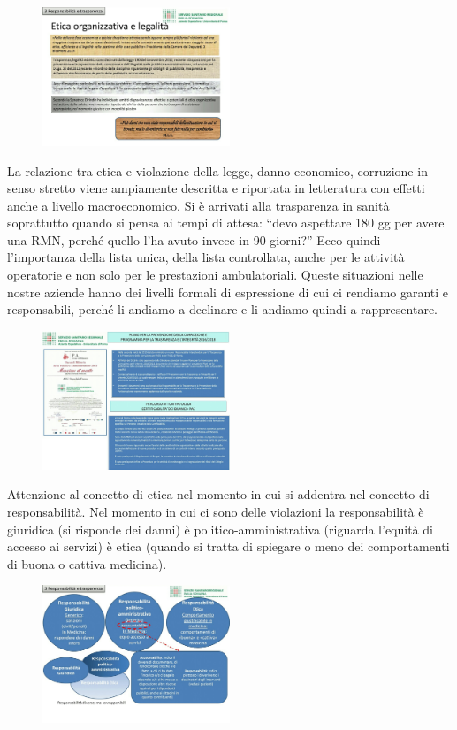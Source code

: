  \begin{figure}[!ht]
\centering
	\includegraphics[width=0.5\textwidth]{32/image14.jpeg}
	\end{figure}

La relazione tra etica e violazione della legge, danno economico,
corruzione in senso stretto viene ampiamente descritta e riportata in
letteratura con effetti anche a livello macroeconomico. Si è arrivati
alla trasparenza in sanità soprattutto quando si pensa ai tempi di
attesa: ``devo aspettare 180 gg per avere una RMN, perché quello l'ha
avuto invece in 90 giorni?'' Ecco quindi l'importanza della lista unica,
della lista controllata, anche per le attività operatorie e non solo per
le prestazioni ambulatoriali. Queste situazioni nelle nostre aziende
hanno dei livelli formali di espressione di cui ci rendiamo garanti e
responsabili, perché li andiamo a declinare e li andiamo quindi a
rappresentare.

 \begin{figure}[!ht]
\centering
	\includegraphics[width=0.5\textwidth]{32/image15.jpeg}
	\end{figure}

Attenzione al concetto di etica nel momento in cui si addentra nel
concetto di responsabilità. Nel momento in cui ci sono delle violazioni
la responsabilità è giuridica (si risponde dei danni) è
politico-amministrativa (riguarda l'equità di accesso ai servizi) è
etica (quando si tratta di spiegare o meno dei comportamenti di buona o
cattiva medicina).

 \begin{figure}[!ht]
\centering
	\includegraphics[width=0.5\textwidth]{32/image16.jpeg}
	\end{figure}

